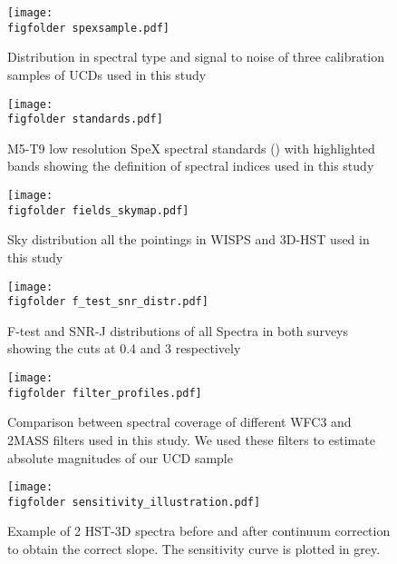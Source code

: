 \newcommand{\figfolder}{/users/caganze/research/wisps/figures/}
\newcommand{\spectrafolder}{/Users/caganze/research/wisps/figures/ltwarfs/}




\begin{figure*}
   \centering
   \texttt{[image: \\figfolder spexsample.pdf]}
   \caption{Distribution in spectral type and signal to noise of three calibration samples of UCDs used in this study}
   \label{fig:spexsample}
\end{figure*}


\begin{figure*}
    \centering
    \texttt{[image: \\figfolder standards.pdf]}
    \caption{M5-T9 low resolution SpeX spectral standards (\citealt{2010ApJS..190..100K}) with highlighted bands showing the definition of spectral indices used in this study}
    \label{fig:indexdefinition}
\end{figure*}



\begin{figure*}
    \centering
    \texttt{[image: \\figfolder fields\_skymap.pdf]}
    \caption{Sky distribution all the pointings in WISPS and 3D-HST used in this study}
    \label{fig:skymap}
\end{figure*}

\begin{figure*}
    \centering
    \texttt{[image: \\figfolder f\_test\_snr\_distr.pdf]}
    \caption{F-test and SNR-J distributions of all Spectra in both surveys showing the cuts at 0.4 and 3 respectively}
    \label{fig:ftestdistr}
\end{figure*}



\begin{figure*}
    \centering
    \texttt{[image: \\figfolder filter\_profiles.pdf]}
    \caption{Comparison between spectral coverage of different WFC3 and 2MASS filters used in this study. We used these filters to estimate absolute magnitudes of our UCD sample}
    \label{fig:filterprofiles}
\end{figure*}



\begin{figure*}
\centering
\texttt{[image: \\figfolder sensitivity\_illustration.pdf]}
\caption{ Example of 2 HST-3D spectra before and after continuum correction to obtain the correct slope. The sensitivity curve is plotted in grey.}
\label{fig:sensitivity}
\end{figure*}

